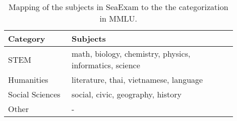 \begin{table}[h!]
\centering
\small
\begin{tabular}{p{0.25\linewidth}p{0.65\linewidth}}
\toprule
\textbf{Category} & \textbf{Subjects} \\ 
\midrule
STEM & math, biology, chemistry, physics, informatics, science \\ 
Humanities & literature, thai, vietnamese, language \\ 
Social Sciences & social, civic, geography, history \\ 
Other & - \\ 
\bottomrule
\end{tabular}
\caption{Mapping of the subjects in SeaExam to the the categorization in MMLU.}
\label{tab:subject_category}
\end{table}